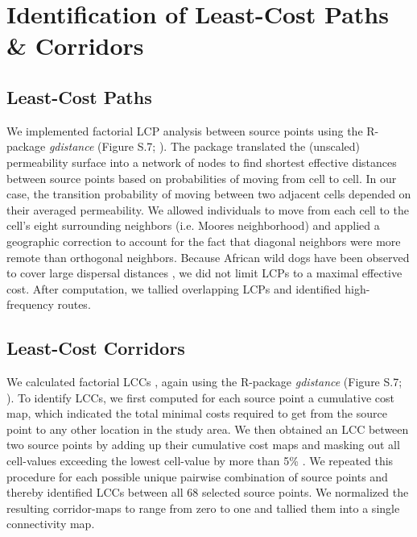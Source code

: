 \documentclass[abstract=off,10pt,a4paper,bibliography=totocnumbered]{article}
\begin{document}
\newpage
\section{Identification of Least-Cost Paths \& Corridors}
\subsection{Least-Cost Paths}
We implemented factorial LCP analysis between source points using the R-package
\textit{gdistance} (Figure S.7; \citealp{vanEtten.2017}). The package translated
the (unscaled) permeability surface into a network of nodes to find shortest
effective distances between source points based on probabilities of moving from
cell to cell. In our case, the transition probability of moving between two
adjacent cells depended on their averaged permeability. We allowed individuals
to move from each cell to the cell's eight surrounding neighbors (i.e. Moores
neighborhood) and applied a geographic correction to account for the fact that
diagonal neighbors were more remote than orthogonal neighbors. Because African
wild dogs have been observed to cover large dispersal distances
\citep{DaviesMostert.2012, Masenga.2016, Cozzi.2020}, we did not limit LCPs to a
maximal effective cost. After computation, we tallied overlapping LCPs and
identified high-frequency routes.

\subsection{Least-Cost Corridors}
We calculated factorial LCCs \citep{Pinto.2009, Sawyer.2011, Elliot.2014}, again
using the R-package \textit{gdistance} (Figure S.7; \citealp{vanEtten.2017}). To
identify LCCs, we first computed for each source point a cumulative cost map,
which indicated the total minimal costs required to get from the source point to
any other location in the study area. We then obtained an LCC between two source
points by adding up their cumulative cost maps and masking out all cell-values
exceeding the lowest cell-value by more than 5\% \citep{Pinto.2009}. We repeated
this procedure for each possible unique pairwise combination of source points
and thereby identified LCCs between all 68 selected source points. We normalized
the resulting corridor-maps to range from zero to one and tallied them into a
single connectivity map.
\end{document}

